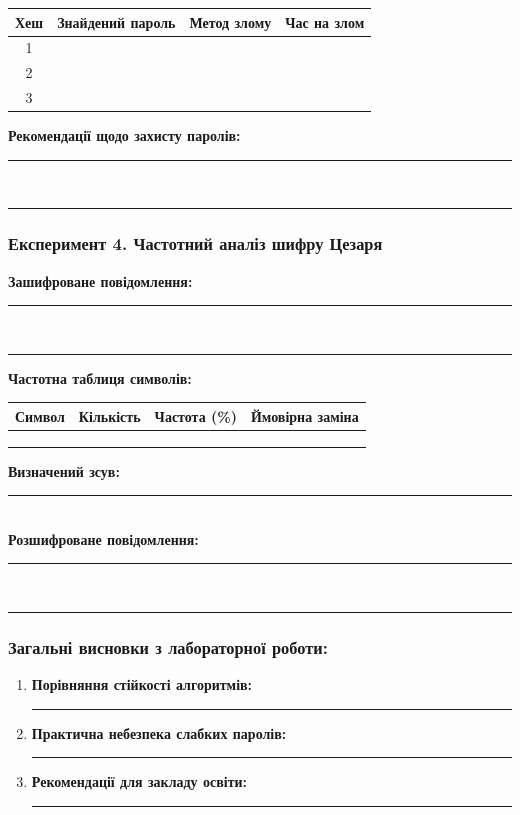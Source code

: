 \begin{table}[h]
\centering
\begin{tabular}{|c|l|l|c|}
\hline
\textbf{Хеш} & \textbf{Знайдений пароль} & \textbf{Метод злому} & \textbf{Час на злом} \\
\hline
1 & & & \\
\hline
2 & & & \\
\hline
3 & & & \\
\hline
\end{tabular}
\end{table}

\noindent
\textbf{Рекомендації щодо захисту паролів:} \rule{9cm}{0.5pt}\\
\rule{15cm}{0.5pt}

\subsubsection*{Експеримент 4. Частотний аналіз шифру Цезаря}

\noindent
\textbf{Зашифроване повідомлення:} \rule{10cm}{0.5pt}\\
\rule{15cm}{0.5pt}

\textbf{Частотна таблиця символів:}

\begin{table}[h]
\centering
\begin{tabular}{|c|c|c|c|}
\hline
\textbf{Символ} & \textbf{Кількість} & \textbf{Частота (\%)} & \textbf{Ймовірна заміна} \\
\hline
 & & & \\
\hline
 & & & \\
\hline
 & & & \\
\hline
\end{tabular}
\end{table}

\noindent
\textbf{Визначений зсув:} \rule{2cm}{0.5pt}\\
\textbf{Розшифроване повідомлення:} \rule{9cm}{0.5pt}\\
\rule{15cm}{0.5pt}

\subsubsection*{Загальні висновки з лабораторної роботи:}
\begin{enumerate}
    \item \textbf{Порівняння стійкості алгоритмів:} \rule{8cm}{0.5pt}
    \item \textbf{Практична небезпека слабких паролів:} \rule{7cm}{0.5pt}
    \item \textbf{Рекомендації для закладу освіти:} \rule{7.5cm}{0.5pt}
\end{enumerate}

